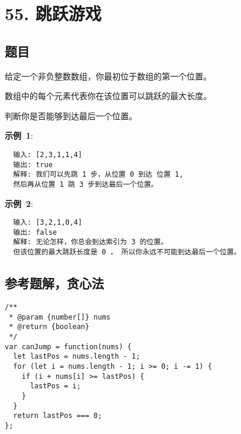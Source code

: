 \newpage
\section{55. 跳跃游戏}
\label{leetcode:55}

\subsection{题目}

给定一个非负整数数组，你最初位于数组的第一个位置。

数组中的每个元素代表你在该位置可以跳跃的最大长度。

判断你是否能够到达最后一个位置。

\textbf{示例 1}:

\begin{verbatim}
  输入: [2,3,1,1,4]
  输出: true
  解释: 我们可以先跳 1 步，从位置 0 到达 位置 1, 
  然后再从位置 1 跳 3 步到达最后一个位置。
\end{verbatim}

\textbf{示例 2}:

\begin{verbatim}
  输入: [3,2,1,0,4]
  输出: false
  解释: 无论怎样，你总会到达索引为 3 的位置。
  但该位置的最大跳跃长度是 0 ， 所以你永远不可能到达最后一个位置。
\end{verbatim}

\subsection{参考题解，贪心法}

\begin{verbatim}
/**
 * @param {number[]} nums
 * @return {boolean}
 */
var canJump = function(nums) {
  let lastPos = nums.length - 1;
  for (let i = nums.length - 1; i >= 0; i -= 1) {
    if (i + nums[i] >= lastPos) {
      lastPos = i;
    }
  }
  return lastPos === 0;
};
\end{verbatim}

